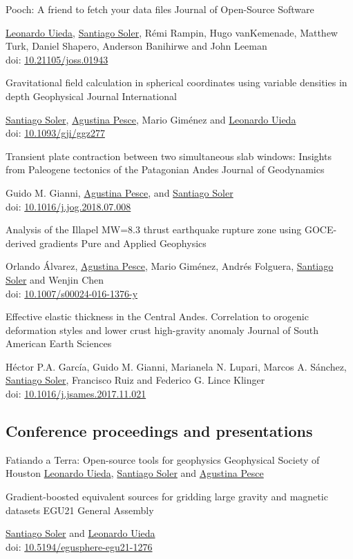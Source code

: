 \documentclass[a4paper,12pt,sans,colorlinks]{moderncv/moderncv}
\newcommand{\me}{\href{https://www.santisoler.com}{Santiago Soler}}
\newcommand{\agustina}{\href{https://aguspesce.github.io}{Agustina Pesce}}
\newcommand{\guido}{Guido M. Gianni}
\newcommand{\leo}{\href{https://www.leouieda.com}{Leonardo Uieda}}
\newcommand{\mario}{Mario Giménez}
\newcommand{\remirampin}{Rémi Rampin}
\newcommand{\hugovankemenade}{Hugo vanKemenade}
\newcommand{\matthewturk}{Matthew Turk}
\newcommand{\danshapero}{Daniel Shapero}
\newcommand{\andersonbanihirwe}{Anderson Banihirwe}
\newcommand{\johnleeman}{John Leeman}
\newcommand{\orlando}{Orlando Álvarez}
\newcommand{\folguera}{Andrés Folguera}
\newcommand{\wenjinchen}{Wenjin Chen}
\newcommand{\pichu}{Héctor P.A. García}
\newcommand{\mae}{Marianela N. Lupari}
\newcommand{\marcos}{Marcos A. Sánchez}
\newcommand{\paco}{Francisco Ruiz}
\newcommand{\fede}{Federico G. Lince Klinger}
\newcommand{\doi}[1]{
    \href{https://doi.org/#1}{#1}
}
\begin{document}
{Pooch: A friend to fetch your data files}
{Journal of Open-Source Software}
{}
{}
{
    \leo{}, \me{}, \remirampin{}, \hugovankemenade{}, \matthewturk{},
    \danshapero{}, \andersonbanihirwe{} and \johnleeman{}
    \\
    doi: \doi{10.21105/joss.01943}
}

{
    Gravitational field calculation in spherical coordinates using variable
    densities in depth
}
{Geophysical Journal International}
{}
{}
{
    \me{}, \agustina{}, \mario{} and \leo{}
    \\
    doi: \doi{10.1093/gji/ggz277}
}

{
    Transient plate contraction between two simultaneous slab windows:
    Insights from Paleogene tectonics of the Patagonian Andes
}
{Journal of Geodynamics}
{}
{}
{
    \guido{}, \agustina{}, and \me{}
    \\
    doi: \doi{10.1016/j.jog.2018.07.008}
}

{
    Analysis of the Illapel MW=8.3 thrust earthquake rupture zone using
    GOCE-derived gradients
}
{Pure and Applied Geophysics}
{}
{}
{
    \orlando{}, \agustina{}, \mario{}, \folguera{}, \me{} and \wenjinchen{}
    \\
    doi: \doi{10.1007/s00024-016-1376-y}
}

{
    Effective elastic thickness in the Central Andes.
    Correlation to orogenic deformation styles and lower crust high-gravity
    anomaly
}
{Journal of South American Earth Sciences}
{}
{}
{
    \pichu{}, \guido{}, \mae{}, \marcos{}, \me{}, \paco{} and \fede{}
    \\
    doi: \doi{10.1016/j.jsames.2017.11.021}
}


\newpage
\subsection{Conference proceedings and presentations}

{Fatiando a Terra: Open-source tools for geophysics}
{Geophysical Society of Houston}
{}
{}
{\leo{}, \me{} and \agustina{}}

{
    Gradient-boosted equivalent sources for gridding large gravity and
    magnetic datasets
}
{EGU21 General Assembly}
{}
{}
{
    \me{} and \leo{}
    \\
    doi: \doi{10.5194/egusphere-egu21-1276}
}
\end{document}
